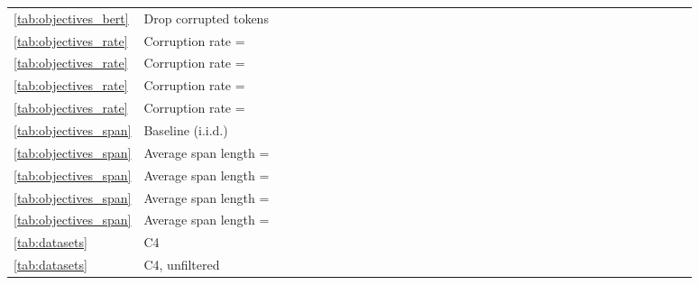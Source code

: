 \documentclass[twoside,11pt]{article}
\newcommand{\bsl}{\makebox[0pt][r]{\raisebox{0.05em}{}}}
\begin{document}
\begin{table}[!ht]
\begin{minipage}{0.85\pdfpagewidth}
\begin{tabular}{llccccccccccccccccccccccccccccccccc}
\ref{tab:objectives_bert} & Drop corrupted tokens &  &  &  &  &  &  &  &  &  &  &  &  &  &  &  &  &  &  &  &  &  &  &  &  &  &  &  &  &  &  &  &  &  \\
\cmidrule(r){1-2} \cmidrule(lr){3-15} \cmidrule(lr){16-18} \cmidrule(lr){19-20} \cmidrule(lr){21-32} \cmidrule(l){33-35}
\ref{tab:objectives_rate} & Corruption rate =  &  &  &  &  &  &  &  &  &  &  &  &  &  &  &  &  &  &  &  &  &  &  &  &  &  &  &  &  &  &  &  &  &  \\
\ref{tab:objectives_rate} & \bsl Corruption rate =  &  &  &  &  &  &  &  &  &  &  &  &  &  &  &  &  &  &  &  &  &  &  &  &  &  &  &  &  &  &  &  &  &  \\
\ref{tab:objectives_rate} & Corruption rate =  &  &  &  &  &  &  &  &  &  &  &  &  &  &  &  &  &  &  &  &  &  &  &  &  &  &  &  &  &  &  &  &  &  \\
\ref{tab:objectives_rate} & Corruption rate =  &  &  &  &  &  &  &  &  &  &  &  &  &  &  &  &  &  &  &  &  &  &  &  &  &  &  &  &  &  &  &  &  &  \\
\cmidrule(r){1-2} \cmidrule(lr){3-15} \cmidrule(lr){16-18} \cmidrule(lr){19-20} \cmidrule(lr){21-32} \cmidrule(l){33-35}
\ref{tab:objectives_span} & \bsl Baseline (i.i.d.) &  &  &  &  &  &  &  &  &  &  &  &  &  &  &  &  &  &  &  &  &  &  &  &  &  &  &  &  &  &  &  &  &  \\
\ref{tab:objectives_span}& Average span length =  &  &  &  &  &  &  &  &  &  &  &  &  &  &  &  &  &  &  &  &  &  &  &  &  &  &  &  &  &  &  &  &  &  \\
\ref{tab:objectives_span}& Average span length =  &  &  &  &  &  &  &  &  &  &  &  &  &  &  &  &  &  &  &  &  &  &  &  &  &  &  &  &  &  &  &  &  &  \\
\ref{tab:objectives_span}& Average span length =  &  &  &  &  &  &  &  &  &  &  &  &  &  &  &  &  &  &  &  &  &  &  &  &  &  &  &  &  &  &  &  &  &  \\
\ref{tab:objectives_span}& Average span length =  &  &  &  &  &  &  &  &  &  &  &  &  &  &  &  &  &  &  &  &  &  &  &  &  &  &  &  &  &  &  &  &  &  \\
\cmidrule(r){1-2} \cmidrule(lr){3-15} \cmidrule(lr){16-18} \cmidrule(lr){19-20} \cmidrule(lr){21-32} \cmidrule(l){33-35}
\ref{tab:datasets} & \bsl C4 &  &  &  &  &  &  &  &  &  &  &  &  &  &  &  &  &  &  &  &  &  &  &  &  &  &  &  &  &  &  &  &  &  \\
\ref{tab:datasets} & C4, unfiltered &  &  &  &  &  &  &  &  &  &  &  &  &  &  &  &  &  &  &  &  &  &  &  &  &  &  &  &  &  &  &  &  &  \\

\end{tabular}
\end{minipage}
\end{table}
\end{document}
